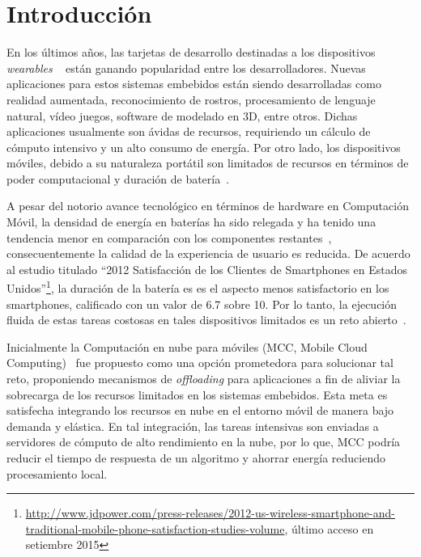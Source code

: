 
\chapter{Introducción} %

\label{Chapter1} %



En los últimos años, las tarjetas de desarrollo destinadas a los dispositivos \textit{wearables} ~\cite{7004894} están ganando popularidad entre los 
desarrolladores. Nuevas aplicaciones para estos sistemas embebidos están siendo desarrolladas como realidad aumentada, reconocimiento de
rostros, procesamiento de lenguaje natural, vídeo juegos, software de modelado en 3D, entre otros. Dichas aplicaciones usualmente son 
ávidas de recursos, requiriendo un cálculo de cómputo intensivo y un alto consumo de energía. Por otro lado, los dispositivos móviles, debido
a su naturaleza portátil son limitados de recursos en términos de poder computacional y duración de batería~\cite{6157576}. 

A pesar del notorio avance tecnológico en términos de hardware en Computación Móvil, la densidad de energía en baterías ha sido relegada y ha tenido una 
tendencia menor en comparación con los componentes restantes~\cite{1401839}, consecuentemente la calidad de la experiencia de usuario es
reducida. De acuerdo al estudio titulado ``2012 Satisfacción de los Clientes de Smartphones en Estados Unidos''\footnote{\tiny \url{http://www.jdpower.com/press-releases/2012-us-wireless-smartphone-and-traditional-mobile-phone-satisfaction-studies-volume}, último acceso en setiembre 2015}, la duración de la batería es 
es el aspecto menos satisfactorio en los smartphones, calificado con un valor de 6.7 sobre 10. Por lo tanto, la ejecución fluida de estas tareas
costosas en tales dispositivos limitados es un reto abierto~\cite{sanaei2014heterogeneity}.

Inicialmente la Computación en nube para móviles (MCC, Mobile Cloud Computing)~\cite{Rahimi2014} fue propuesto como una opción prometedora para solucionar tal 
reto, proponiendo mecanismos de \textit{offloading} para aplicaciones a fin de aliviar la sobrecarga de los recursos limitados en los sistemas
embebidos. Esta meta es satisfecha integrando los recursos en nube en el entorno móvil de manera bajo demanda y elástica. En tal integración, 
las tareas intensivas son enviadas a servidores de cómputo de alto rendimiento en la nube, por lo que, MCC podría reducir el tiempo de respuesta 
de un algoritmo y ahorrar energía reduciendo procesamiento local.

